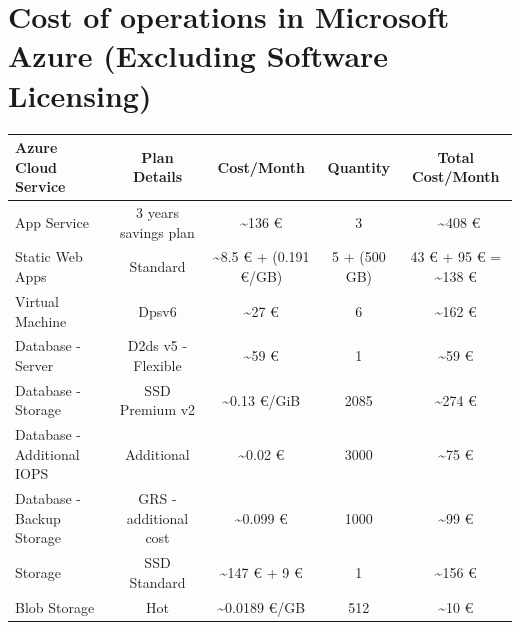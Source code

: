 \documentclass{llncs}
\begin{document}
\section{Cost of operations in Microsoft Azure (Excluding Software Licensing) \cite{azure-pricing-calculator}} 
\begin{table}[htbp]
    \centering
    \begin{tabular}{|l|c|c|c|c|}
        \hline
        \textbf{Azure Cloud Service} & \textbf{Plan Details}    & \textbf{Cost/Month}                & \textbf{Quantity} & \textbf{Total Cost/Month}           \\

        \hline
        App Service                  & 3 years savings plan  & \textasciitilde 136 €                & 3                 & ~\textasciitilde 408 €              \\
        \hline
        Static Web Apps              & Standard              & \textasciitilde 8.5 € + (0.191 €/GB) & 5 + (500 GB)      & 43 € + 95 € = \textasciitilde 138 € \\
        \hline
        Virtual Machine              & Dpsv6                 & \textasciitilde 27 €                 & 6                 & \textasciitilde 162 €               \\
        \hline
        Database - Server            & D2ds v5 - Flexible    & \textasciitilde 59 €            & 1              & \textasciitilde 59 €                          \\
        \hline
        Database - Storage           & SSD Premium v2         & \textasciitilde 0.13 €/GiB           & 2085              & \textasciitilde 274 €            \\
        \hline
        Database - Additional IOPS   &  Additional            &   \textasciitilde 0.02 €             & 3000                 & \textasciitilde 75 €         \\
        \hline
        Database - Backup Storage    & GRS - additional cost    & \textasciitilde 0.099 €         & 1000            & \textasciitilde 99 €                             \\
        \hline
        Storage                      & SSD Standard             & \textasciitilde 147 € + 9 €        & 1           & \textasciitilde 156 €                             \\
        \hline
        Blob Storage                 & Hot                      & \textasciitilde 0.0189 €/GB        & 512           & \textasciitilde 10 €                             \\

\end{tabular}
\end{table}
\end{document}

